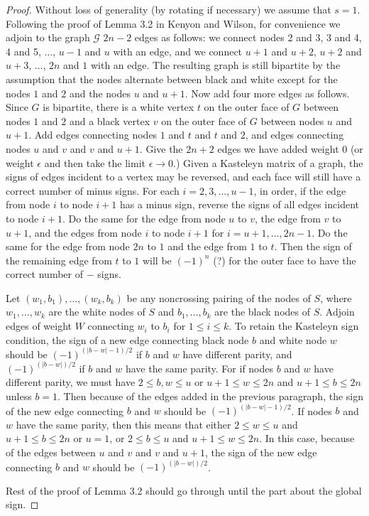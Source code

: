 \documentclass[11pt]{amsart}
\theoremstyle{definition}
\begin{document}
\begin{proof}
Without loss of generality (by rotating if necessary) we assume that $s = 1$.
Following the proof of Lemma 3.2 in Kenyon and Wilson, for convenience we adjoin to the graph $\mathcal{G}$ $2n-2$ edges as follows: we
connect nodes 2 and 3, 3 and 4, 4 and 5, $\ldots$, $u-1$ and $u$ with an edge, and we connect $u+1$ and $u+2$, $u+2$ and $u+3$, $\ldots$, $2n$ and $1$ with an edge. The resulting graph is still bipartite by the assumption that the nodes alternate between black and white except for the nodes $1$ and $2$ and the nodes $u$ and $u+1$. Now add four more edges as follows. Since $G$ is bipartite, there is a white vertex $t$ on the outer face of $G$ between nodes $1$ and $2$ and a black vertex $v$ on the outer face of $G$ between nodes $u$ and $u+1$. Add edges connecting nodes $1$ and $t$ and $t$ and $2$, and edges connecting nodes $u$ and $v$ and $v$ and $u+1$. Give the $2n+2$ edges we have added weight 0 (or weight $\epsilon$ and then take the limit $\epsilon \to 0$.) Given a Kasteleyn matrix of a graph, the signs of edges incident to a vertex may be reversed, and each face will still have a correct number of minus signs. For each $i = 2, 3, \ldots, u-1$, in order, if the edge from node $i$ to node $i+1$ has a minus sign, reverse the signs of all edges incident to node $i+1$. Do the same for the edge from node $u$ to $v$, the edge from $v$ to $u+1$, and the edges from node $i$ to node $i +1$ for $i = u+1, \ldots, 2n-1$. Do the same for the edge from node $2n$ to $1$ and the edge from $1$ to $t$. Then the sign of the remaining edge from $t$ to $1$ will be $(-1)^n$ (?) for the outer face to have the correct number of $-$ signs. 

Let $(w_1, b_1), \ldots, (w_k, b_k)$ be any noncrossing pairing of the nodes of $S$, where $w_1, \ldots, w_k$ are the white nodes of $S$ and $b_1, \ldots, b_k$ are the black nodes of $S$. Adjoin edges of weight $W$ connecting $w_i$ to $b_i$ for $1 \leq i \leq k$. To retain the Kasteleyn sign condition, the sign of a new edge connecting black node $b$ and white node $w$ should be $(-1)^{(|b-w|-1)/2}$ if $b$ and $w$ have different parity, and $(-1)^{(|b-w|)/2}$ if $b$ and $w$ have the same parity. For if nodes $b$ and $w$ have different parity, we must have $2 \leq b, w \leq u$ or $u+1 \leq w \leq 2n$ and $u+1 \leq b \leq 2n$ unless $b = 1$. Then because of the edges added in the previous paragraph, the sign of the new edge connecting $b$ and $w$ should be $(-1)^{(|b-w|-1)/2}$. If nodes $b$ and $w$ have the same parity, then this means that either $2 \leq w \leq u$ and $u+1 \leq b \leq 2n$ or $u = 1$, or $2 \leq b \leq u$ and $u+1 \leq w \leq 2n$. In this case, because of the edges between $u$ and $v$ and $v$ and $u+1$, the sign of the new edge connecting $b$ and $w$ should be $(-1)^{(|b-w|)/2}$. 

Rest of the proof of Lemma 3.2 should go through until the part about the global sign. 
\end{proof}
\end{document}
